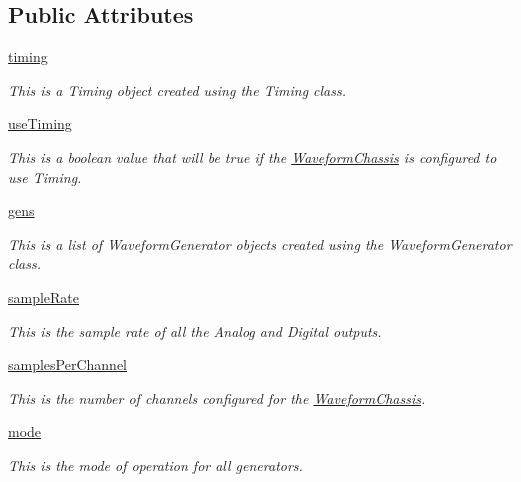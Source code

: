 \subsection*{Public Attributes}
\begin{DoxyCompactItemize}
\item 
\hyperlink{class_waveform_chassis_1_1_waveform_chassis_a3893045e5a6a259762feb0ee2f313648}{timing}
\begin{DoxyCompactList}\small\item\em This is a Timing object created using the Timing class. \end{DoxyCompactList}\item 
\hyperlink{class_waveform_chassis_1_1_waveform_chassis_a18dae1f29299d1dbd02b06e0f2b5270c}{use\-Timing}
\begin{DoxyCompactList}\small\item\em This is a boolean value that will be true if the \hyperlink{class_waveform_chassis_1_1_waveform_chassis}{Waveform\-Chassis} is configured to use Timing. \end{DoxyCompactList}\item 
\hyperlink{class_waveform_chassis_1_1_waveform_chassis_a9b7abe44035b7e5077bfe7363221d66f}{gens}
\begin{DoxyCompactList}\small\item\em This is a list of Waveform\-Generator objects created using the Waveform\-Generator class. \end{DoxyCompactList}\item 
\hyperlink{class_waveform_chassis_1_1_waveform_chassis_ab15b973ee2283c67e5178280245fe585}{sample\-Rate}
\begin{DoxyCompactList}\small\item\em This is the sample rate of all the Analog and Digital outputs. \end{DoxyCompactList}\item 
\hyperlink{class_waveform_chassis_1_1_waveform_chassis_aec121d179ad4d3bbc2da3a2469dd2dfa}{samples\-Per\-Channel}
\begin{DoxyCompactList}\small\item\em This is the number of channels configured for the \hyperlink{class_waveform_chassis_1_1_waveform_chassis}{Waveform\-Chassis}. \end{DoxyCompactList}\item 
\hyperlink{class_waveform_chassis_1_1_waveform_chassis_a87be64310be9b7775c6915cbdfa7a2af}{mode}
\begin{DoxyCompactList}\small\item\em This is the mode of operation for all generators. \end{DoxyCompactList}\item 

\end{DoxyCompactItemize}
